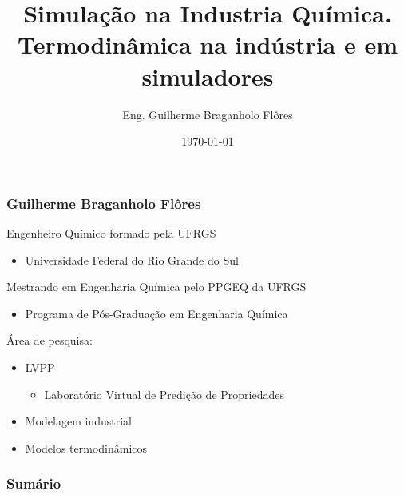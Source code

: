 \documentclass[aspectratio=169]{beamer}
\title[Simulação na Industria Química]{Simulação na Industria Química.\\
Termodinâmica na indústria e em simuladores }
\author{Eng. Guilherme Braganholo Flôres} %
\institute[PPGEQ - UFRGS] %
{
UNIVERSIDADE FEDERAL DO RIO GRANDE DO SUL \\
ESCOLA DE ENGENHARIA \\
DEPARTAMENTO DE ENGENHARIA QUÍMICA \\
LAB. VIRTUAL DE PREDIÇÃO DE PROPRIEDADE \\ %
\medskip
\textit{gbflores89@gmail.com} %
}
\date{\today} %
\begin{document}
\begin{frame}
\titlepage %
\end{frame}

\begin{frame}
	\frametitle{Guilherme Braganholo Flôres}
	Engenheiro Químico formado pela UFRGS
	\begin{itemize} 
		\item Universidade Federal do Rio Grande do Sul
	\end{itemize}

	Mestrando em Engenharia Química pelo PPGEQ da UFRGS
	\begin{itemize}
		\item Programa de Pós-Graduação em Engenharia Química
	\end{itemize}
 	\pause
	Área de pesquisa:
	\begin{itemize}
		\item LVPP
		\begin{itemize}
			\item Laboratório Virtual de Predição de Propriedades
		\end{itemize}
	\item Modelagem industrial 
	\item Modelos termodinâmicos
	\end{itemize}
\end{frame}


\begin{frame}
\frametitle{Sumário} %
\tableofcontents %
\end{frame}

\end{document}
